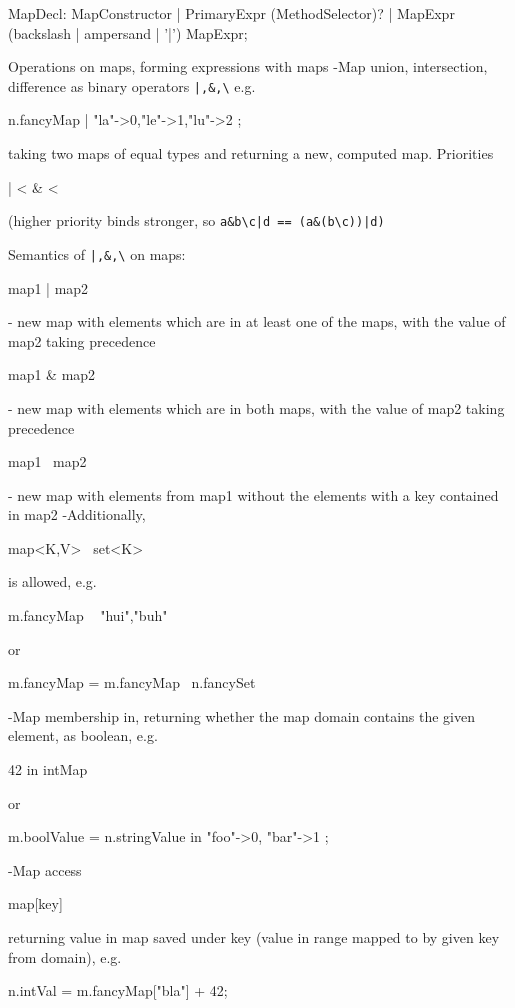 \begin{rail}
  MapDecl: MapConstructor | PrimaryExpr (MethodSelector)? | MapExpr (backslash | ampersand | '|') MapExpr;
\end{rail}

Operations on maps, forming expressions with maps
-Map union, intersection, difference as binary operators
\verb#|,&,\#
e.g. 
\begin{grgenlet} 
n.fancyMap | { "la"->0,"le"->1,"lu"->2 };
\end{grgenlet}
taking two maps of equal types and returning a new, computed map.
Priorities 
\begin{grgenlet}
| < & < \
\end{grgenlet}
(higher priority binds stronger, so
\verb#a&b\c|d == (a&(b\c))|d)#

Semantics of \verb#|,&,\# on maps:
\begin{grgenlet}
map1 | map2
\end{grgenlet}
 - new map with elements which are in at least one of the maps, with the value of map2 taking precedence
\begin{grgenlet}
map1 & map2
\end{grgenlet}
- new map with elements which are in both maps, with the value of map2 taking precedence
\begin{grgenlet}
map1 \ map2
\end{grgenlet}
- new map with elements from map1 without the elements with a key contained in map2
-Additionally, 
\begin{grgenlet}
map<K,V> \ set<K>
\end{grgenlet}
is allowed, e.g.
\begin{grgenlet}
m.fancyMap \ { "hui","buh" }
\end{grgenlet} 
or 
\begin{grgenlet}
m.fancyMap = m.fancyMap \ n.fancySet 
\end{grgenlet}
-Map membership in, returning whether the map domain contains the given element, as boolean, e.g. 
\begin{grgenlet}
42 in intMap
\end{grgenlet}  
or  
\begin{grgenlet}
m.boolValue = n.stringValue in { "foo"->0, "bar"->1 };
\end{grgenlet}
-Map access 
\begin{grgenlet}
map[key]
\end{grgenlet}
returning value in map saved under key (value in range mapped to by given key from domain), e.g.
\begin{grgenlet}
n.intVal = m.fancyMap["bla"] + 42;
\end{grgenlet}

